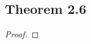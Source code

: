 \documentclass[../../main.tex]{subfiles}
\begin{document}
\subsection{Theorem 2.6}
\begin{wts}

\end{wts}
\begin{proof}

\end{proof}
\end{document}
